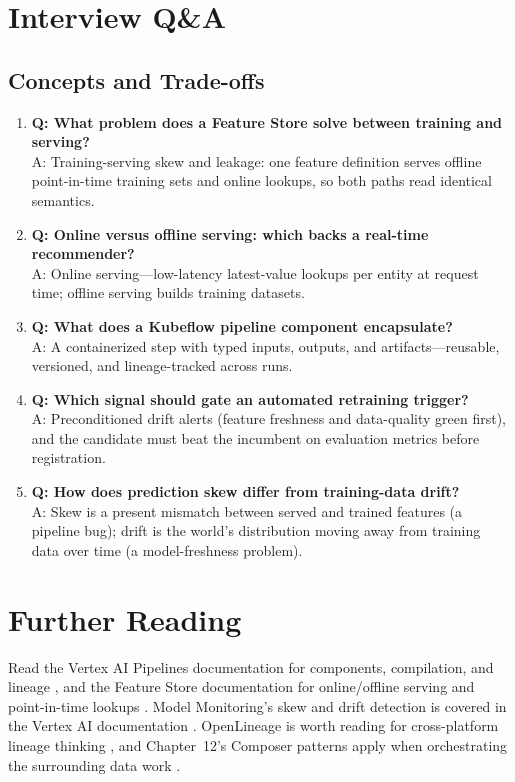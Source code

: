 \section{Interview Q\&A}
\subsection{Concepts and Trade-offs}
\begin{enumerate}
    \item \textbf{Q: What problem does a Feature Store solve between training and serving?}\\
    A: Training-serving skew and leakage: one feature definition serves offline point-in-time training sets and online lookups, so both paths read identical semantics.

    \item \textbf{Q: Online versus offline serving: which backs a real-time recommender?}\\
    A: Online serving---low-latency latest-value lookups per entity at request time; offline serving builds training datasets.

    \item \textbf{Q: What does a Kubeflow pipeline component encapsulate?}\\
    A: A containerized step with typed inputs, outputs, and artifacts---reusable, versioned, and lineage-tracked across runs.

    \item \textbf{Q: Which signal should gate an automated retraining trigger?}\\
    A: Preconditioned drift alerts (feature freshness and data-quality green first), and the candidate must beat the incumbent on evaluation metrics before registration.

    \item \textbf{Q: How does prediction skew differ from training-data drift?}\\
    A: Skew is a present mismatch between served and trained features (a pipeline bug); drift is the world's distribution moving away from training data over time (a model-freshness problem).
\end{enumerate}

\section{Further Reading}
Read the Vertex AI Pipelines documentation for components, compilation, and lineage \cite{googlecloudvertexpipelines}, and the Feature Store documentation for online/offline serving and point-in-time lookups \cite{googlecloudfeaturestore}. Model Monitoring's skew and drift detection is covered in the Vertex AI documentation \cite{googlecloudvertexaidocs}. OpenLineage is worth reading for cross-platform lineage thinking \cite{googleclouddataplexdocs}, and Chapter~12's Composer patterns apply when orchestrating the surrounding data work \cite{googlecloudcomposerdocs}.

